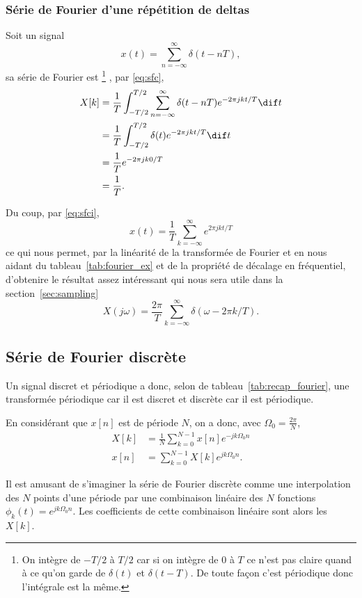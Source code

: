 \subsubsection{Série de Fourier d'une répétition de deltas}
\label{sec:deltas}
Soit un signal
\[ x(t) = \sum_{n=-\infty}^\infty \delta(t-nT), \]
sa série de Fourier est
\footnote{On intègre de $-T/2$ à $T/2$ car si on intègre
de $0$ à $T$ ce n'est pas claire quand à ce qu'on garde de $\delta(t)$ et
$\delta(t-T)$.
De toute façon c'est périodique donc l'intégrale est la même.}
, par \eqref{eq:sfc},
\begin{align*}
  X[k] & = \frac{1}{T}\int_{-T/2}^{T/2} \sum_{n=-\infty}^\infty \delta(t-nT)
  e^{-2\pi jkt/T} \dif t\\
  & = \frac{1}{T}\int_{-T/2}^{T/2} \delta(t) e^{-2\pi jkt/T} \dif t\\
  & = \frac{1}{T} e^{-2\pi jk0/T}\\
  & = \frac{1}{T}.\\
\end{align*}

Du coup, par \eqref{eq:sfci},
\[ x(t) = \frac{1}{T}\sum_{k=-\infty}^\infty e^{2\pi jkt/T} \]
ce qui nous permet,
par la linéarité de la transformée de Fourier et en nous aidant du
tableau~\ref{tab:fourier_ex} et de la propriété de décalage en fréquentiel,
d'obtenire le résultat assez intéressant
qui nous sera utile dans la section~\ref{sec:sampling}
\[ X(j\omega) = \frac{2\pi}{T}
\sum_{k=-\infty}^\infty \delta(\omega-2\pi k/T). \]

\subsection{Série de Fourier discrète}
Un signal discret et périodique a donc,
selon de tableau~\ref{tab:recap_fourier}, une transformée
périodique car il est discret et discrète car il est périodique.

En considérant que $x[n]$ est de période $N$, on a donc,
avec $\Omega_0 = \frac{2\pi}{N}$,
\begin{align}
  \label{eq:sfd}
  X[k] & = \frac{1}{N} \sum_{k=0}^{N-1}x[n]e^{-jk\Omega_0n}\\
  \nonumber
  x[n] & = \sum_{k=0}^{N-1}X[k]e^{jk\Omega_0n}.
\end{align}

Il est amusant de s'imaginer la série de Fourier discrète
comme une interpolation des $N$ points d'une période par
une combinaison linéaire des $N$ fonctions $\phi_k(t) = e^{jk\Omega_0n}$.
Les coefficients de cette combinaison linéaire sont alors les $X[k]$.

